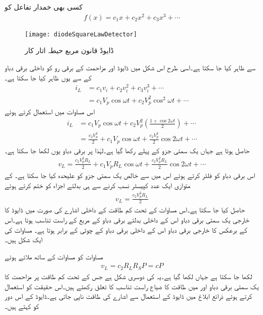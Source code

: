 کسی بھی خمدار تفاعل  کو  
\begin{align*}
f(x)=c_1 x+c_2 x^2+c_3 x^3+\cdots
\end{align*}
%
\begin{figure}
\centering
\texttt{[image: diodeSquareLawDetector]}
\caption{ڈایوڈ قانون مربع حیطہ اتار کار}
\label{شکل_ڈایوڈ_طاقت_کا_ناپ}
\end{figure}
%
سے ظاہر کیا جا سکتا ہے۔اسی طرح اس شکل میں ڈایوڈ اور مزاحمت  کے برقی رو کو داخلی برقی دباو  کے  سے یوں ظاہر کیا جا سکتا ہے۔
\begin{align*}
i_L&=c_1 v_i+c_2 v_i^2+c_3 v_i^3+\cdots \\
&=c_1 V_p \cos \omega t+c_2 V_p^2 \cos^2 \omega t+\cdots
\end{align*}
اس مساوات میں   استعمال کرتے ہوئے
\begin{align*}
i_L&=c_1 V_p \cos \omega t+c_2 V_p^2 \left(\frac{1+\cos 2\omega t}{2} \right)+\cdots\\
&=\frac{c_2 V_p^2}{2}+c_1 V_p \cos \omega t+\frac{c_2 V_p^2}{2} \cos 2 \omega t +\cdots
\end{align*}
حاصل ہوتا ہے جہاں یک سمتی جزو کے پہلے رکھا گیا ہے۔لہٰذا  پر برقی دباو  یوں لکھا جا سکتا ہے۔ 
\begin{align*}
v_L=\frac{c_2 V_p^2 R_L}{2}+c_1 V_p R_L \cos \omega t+\frac{c_2 V_p^2 R_L}{2} \cos 2 \omega t +\cdots
\end{align*}
اس برقی دباو کو فلٹر کرتے ہوئے اس میں سے خالص یک سمتی جزو کو علیحدہ کیا جا سکتا ہے۔ کے متوازی ایک عدد کپیسٹر نسب کرنے سے  ہی بدلتے اجزاء کو ختم کرتے ہوئے
\begin{align}\label{مساوات_ڈایوڈ_مربع_شناسندہ}
v_L=\frac{c_2 V_p^2 R_L}{2}
\end{align}
حاصل کیا جا سکتا ہے۔اس مساوات کے تحت کم طاقت کے داخلی اشارے کی صورت میں ڈایوڈ کا خارجی یک سمتی برقی دباو اس کے داخلی بدلتے برقی دباو کے مربع کے راست تناسب ہوتا ہے۔اس کے برعکس  کا خارجی برقی دباو اس کے داخلی برقی دباو کے چوٹی کے برابر ہوتا ہے۔ مساوات   کی ایک شکل ہیں۔

مساوات  کو مساوات  کے ساتھ ملاتے ہوئے
\begin{align}
v_L=c_2 R_L R_S P = c P 
\end{align}
لکھا جا سکتا ہے جہاں  لکھا گیا ہے۔یہ  کی دوسری شکل ہے جس کے تحت کم طاقت پر مزاحمت  کا یک سمتی برقی دباو اور  میں طاقت کا ضیاع راست تناسب کا تعلق رکھتے ہیں۔اس حقیقت کو استعمال کرتے ہوئے ذرائع ابلاغ میں ڈایوڈ کے استعمال سے اشارے کی طاقت ناپی جاتی ہے۔ڈایوڈ کے اس دور کو  کہتے ہیں۔

